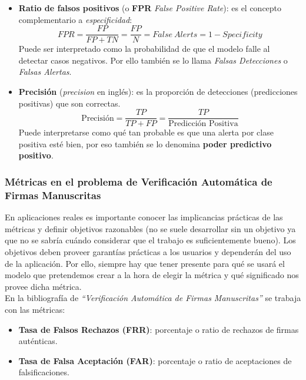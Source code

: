 \begin{itemize}
    \item \textbf{Ratio de falsos positivos} (o \textbf{FPR} \textit{False Positive Rate}): es el concepto complementario a \textit{especificidad}:
    \begin{equation*}
    FPR = \frac{FP}{FP+TN} = \frac{FP}{N} = False~Alerts = 1 - Specificity
    \end{equation*}
    Puede ser interpretado como la probabilidad de que el modelo falle al detectar casos negativos. Por ello también se lo llama \textit{Falsas Detecciones} o \textit{Falsas Alertas}.
    
    
    \item \textbf{Precisión} (\textit{precision} en inglés): es la proporción de detecciones (predicciones positivas) que son correctas.
    \begin{equation*}
    \text{Precisión} = \frac{TP}{TP+FP} = \frac{TP}{\text{Predicción~Positiva}}
    \end{equation*}
    Puede interpretarse como qué tan probable es que una alerta por clase positiva esté bien, por eso también se lo denomina \textbf{poder predictivo positivo}.
\end{itemize}

\subsubsection{Métricas en el problema de Verificación Automática de Firmas Manuscritas} \label{subsubsection:metricasfirmas}

En aplicaciones reales es importante conocer las implicancias prácticas de las métricas y definir objetivos razonables (no se suele desarrollar sin un objetivo ya que no se sabría cuándo considerar que el trabajo es suficientemente bueno). Los objetivos deben proveer garantías prácticas a los usuarios y dependerán del uso de la aplicación. Por ello, siempre hay que tener presente para qué se usará el modelo que pretendemos crear a la hora de elegir la métrica y qué significado nos provee dicha métrica. \\

En la bibliografía de \textit{``Verificación Automática de Firmas Manuscritas''} \cite{tesis-parodi} se trabaja con las métricas:
\begin{itemize}
    \item \textbf{Tasa de Falsos Rechazos (FRR)}: porcentaje o ratio de rechazos de firmas auténticas.
    \item \textbf{Tasa de Falsa Aceptación (FAR)}: porcentaje o ratio de aceptaciones de falsificaciones.
\end{itemize}


